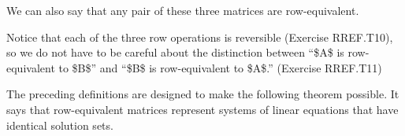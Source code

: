 \documentclass[openany]{book}
\begin{document}
We can also say that any pair of these three matrices are
row-equivalent.

Notice that each of the three row operations is reversible ({Exercise
RREF.T10}), so we do not have to be careful about the distinction
between ``\$A\$ is row-equivalent to \$B\$'' and ``\$B\$ is
row-equivalent to \$A\$.'' ({Exercise RREF.T11})

The preceding definitions are designed to make the following theorem
possible. It says that row-equivalent matrices represent systems of
linear equations that have identical solution sets.
\end{document}
